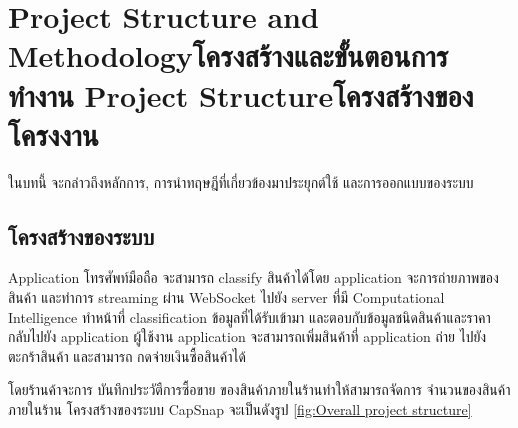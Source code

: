 \chapter{\ifproject%
    \ifenglish Project Structure and Methodology\else โครงสร้างและขั้นตอนการทำงาน\fi
  \else%
    \ifenglish Project Structure\else โครงสร้างของโครงงาน\fi
  \fi
 }

ในบทนี้ จะกล่าวถึงหลักการ,  การนําทฤษฎีที่เกี่ยวข้องมาประยุกต์ใช้  และการออกแบบของระบบ


\makeatletter


\makeatother
\section{โครงสร้างของระบบ}

Application โทรศัพท์มือถือ จะสามารถ classify สินค้าได้โดย application จะการถ่ายภาพของสินค้า และทำการ streaming ผ่าน WebSocket
ไปยัง server ที่มี Computational Intelligence ทำหน้าที่ classification ข้อมูลที่ได้รับเข้ามา  และตอบกับข้อมูลชนิดสินค้าและราคา กลับไปยัง application
ผู้ใช้งาน application จะสามารถเพิ่มสินค้าที่ application ถ่าย ไปยังตะกร้าสินค้า และสามารถ กดจ่ายเงินซื้อสินค้าได้

โดยร้านค้าจะการ บันทึกประวัตืการซื้อขาย ของสินค้าภายในร้านทำให้สามารถจัดการ จำนวนของสินค้าภายในร้าน โครงสร้างของระบบ CapSnap จะเป็นดังรูป \ref{fig:Overall project structure}



